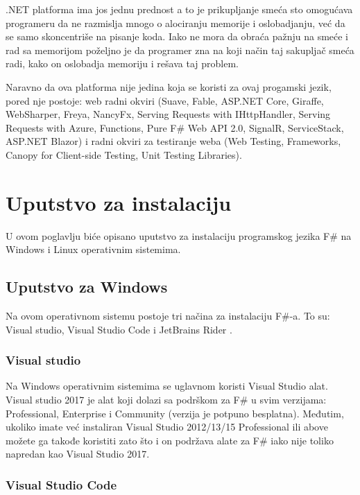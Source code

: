 \documentclass[a4paper]{article}
\begin{document}
.NET platforma ima jos jednu prednost a to je prikupljanje smeća sto omogućava programeru da ne razmislja mnogo o alociranju memorije i oslobadjanju, već da se samo skoncentriše na pisanje koda. Iako ne mora da obraća pažnju na smeće i rad sa memorijom poželjno je da programer zna na koji način taj sakupljač smeća radi, kako on oslobadja memoriju i rešava taj problem.

Naravno da ova platforma nije jedina koja se koristi za ovaj progamski jezik, pored nje postoje: web radni okviri (Suave, Fable, ASP.NET Core, Giraffe, WebSharper, Freya, NancyFx, Serving Requests with IHttpHandler, Serving Requests with Azure, Functions, Pure F\# Web API 2.0, SignalR, ServiceStack, ASP.NET Blazor) i radni okviri za testiranje weba (Web Testing, Frameworks, Canopy for Client-side Testing, Unit Testing Libraries)\cite{fwFs}.

\section{Uputstvo za instalaciju}

U ovom poglavlju biće opisano uputstvo za instalaciju programskog jezika F\# na Windows i Linux operativnim sistemima.

\subsection{Uputstvo za Windows}

Na ovom operativnom sistemu postoje tri načina za instalaciju F\#-a. To su: Visual studio\cite{vStud}, Visual Studio Code \cite{vStudCode} i JetBrains Rider \cite{jetBrains}.

\subsubsection{Visual studio}
	
Na Windows operativnim sistemima se uglavnom koristi Visual Studio alat. Visual studio 2017 je alat koji dolazi sa podrškom za F\# u svim verzijama: Professional, Enterprise i Community (verzija je potpuno besplatna). Međutim, ukoliko imate  već instaliran Visual Studio 2012/13/15  Professional ili above možete ga takođe koristiti zato što i on podržava alate za F\# iako nije toliko napredan kao Visual Studio 2017.

\subsubsection{Visual Studio Code}
	
\end{document}
